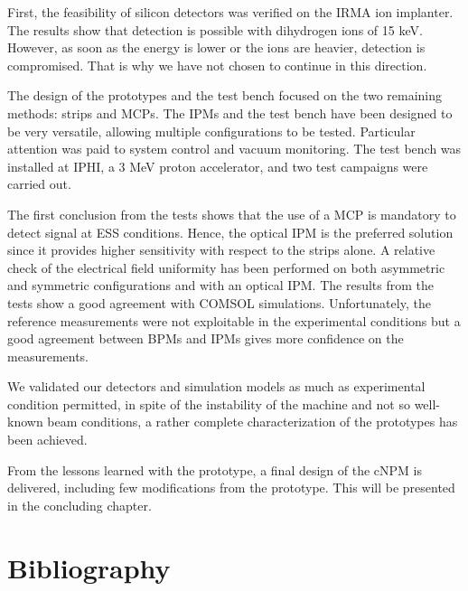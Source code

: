 \begin{refsection}
  First, the feasibility of silicon detectors was verified on the IRMA ion implanter. The results show that detection is possible with dihydrogen ions of 15 keV. However, as soon as the energy is lower or the ions are heavier, detection is compromised. That is why we have not chosen to continue in this direction.

  The design of the prototypes and the test bench focused on the two remaining methods: strips and MCPs. The IPMs and the test bench have been designed to be very versatile, allowing multiple configurations to be tested. Particular attention was paid to system control and vacuum monitoring. The test bench was installed at IPHI, a 3 MeV proton accelerator, and two test campaigns were carried out.

  The first conclusion from the tests shows that the use of a MCP is mandatory to detect signal at ESS conditions. Hence, the optical IPM is the preferred solution since it provides higher sensitivity with respect to the strips alone. A relative check of the electrical field uniformity has been performed on both asymmetric and symmetric configurations and with an optical IPM. The results from the tests show a good agreement with COMSOL simulations.
  Unfortunately, the reference measurements were not exploitable in the experimental conditions but a good agreement between BPMs and IPMs gives more confidence on the measurements.

  We validated our detectors and simulation models as much as experimental condition permitted, in spite of the instability of the machine and not so well-known beam conditions, a rather complete characterization of the prototypes has been achieved.

  From the lessons learned with the prototype, a final design of the cNPM is delivered, including few modifications from the prototype. This will be presented in the concluding chapter.

  \cleardoublepage
  \section{Bibliography}
  \label{ch4:bib}
  \printbibliography[heading=subbibliography]

\end{refsection}

